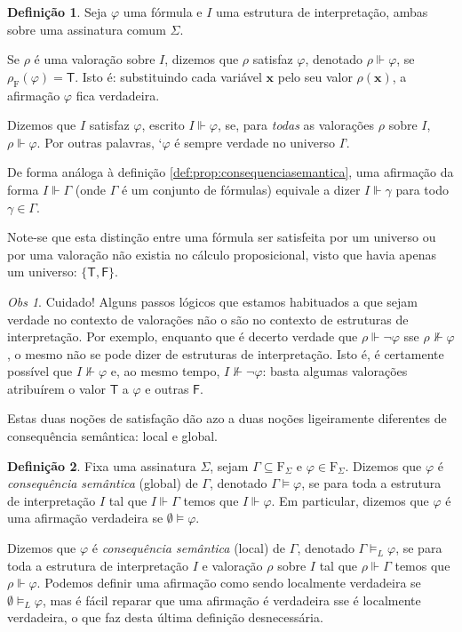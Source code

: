 \documentclass{report}
\theoremstyle{definition}
\newtheorem{definicao}{Definição}
\theoremstyle{remark}
\newtheorem{obs}{Obs}
\renewcommand{\bf}[1]{\mathbf{#1}}
\newcommand{\F}{\mathrm{F}}
\newcommand{\lt}{\mathsf{T}}
\newcommand{\lf}{\mathsf{F}}
\begin{document}
	\begin{definicao}
	Seja $\varphi$ uma fórmula e $I$ uma estrutura de interpretação, ambas sobre uma assinatura comum $\Sigma$.
	
	Se $\rho$ é uma valoração sobre $I$, dizemos que $\rho$ satisfaz $\varphi$, denotado $\rho \Vdash \varphi$, se $\rho_\F(\varphi) = \lt$. Isto é: substituindo cada variável $\bf x$ pelo seu valor $\rho(\bf x)$, a afirmação $\varphi$ fica verdadeira.
	
	Dizemos que $I$ satisfaz $\varphi$, escrito $I \Vdash \varphi$, se, para \emph{todas} as valorações $\rho$ sobre $I$, $\rho \Vdash \varphi$. Por outras palavras, `$\varphi$ é sempre verdade no universo $I$'.
	
	De forma análoga à definição \ref{def:prop:consequenciasemantica}, uma afirmação da forma $I \Vdash \Gamma$ (onde $\Gamma$ é um conjunto de fórmulas) equivale a dizer $I \Vdash \gamma$ para todo $\gamma \in \Gamma$.
	\end{definicao}
	
	Note-se que esta distinção entre uma fórmula ser satisfeita por um universo ou por uma valoração não existia no cálculo proposicional, visto que havia apenas um universo: $\{\lt, \lf\}$.
	
	\begin{obs}\label{structuresatisfactionnotnice}
	Cuidado! Alguns passos lógicos que estamos habituados a que sejam verdade no contexto de valorações não o são no contexto de estruturas de interpretação. Por exemplo, enquanto que é decerto verdade que $\rho \Vdash \neg \varphi$ sse $\rho \nVdash \varphi$, o mesmo não se pode dizer de estruturas de interpretação. Isto é, é certamente possível que $I \nVdash \varphi$ e, ao mesmo tempo, $I \nVdash \neg \varphi$: basta algumas valorações atribuírem o valor $\lt$ a $\varphi$ e outras $\lf$.
	\end{obs}
	
	Estas duas noções de satisfação dão azo a duas noções ligeiramente diferentes de consequência semântica: local e global.
	
	\begin{definicao}
	Fixa uma assinatura $\Sigma$, sejam $\Gamma \subseteq \F_\Sigma$ e $\varphi \in \F_\Sigma$. Dizemos que $\varphi$ é \emph{consequência semântica} (global) de $\Gamma$, denotado $\Gamma \vDash \varphi$, se para toda a estrutura de interpretação $I$ tal que $I \Vdash \Gamma$ temos que $I \Vdash \varphi$. Em particular, dizemos que $\varphi$ é uma afirmação verdadeira se $\emptyset \vDash \varphi$.
	
	Dizemos que $\varphi$ é \emph{consequência semântica} (local) de $\Gamma$, denotado $\Gamma \vDash_L \varphi$, se para toda a estrutura de interpretação $I$ e valoração $\rho$ sobre $I$ tal que $\rho \Vdash \Gamma$ temos que $\rho \Vdash \varphi$. Podemos definir uma afirmação como sendo localmente verdadeira se $\emptyset \vDash_L \varphi$, mas é fácil reparar que uma afirmação é verdadeira sse é localmente verdadeira, o que faz desta última definição desnecessária.
	\end{definicao}
	
\end{document}
